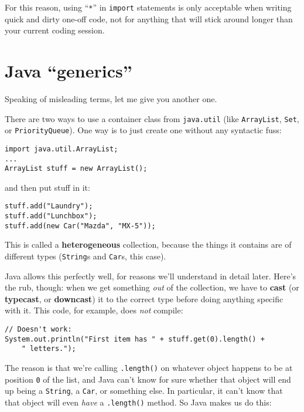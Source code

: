 For this reason, using ``\texttt{*}'' in \texttt{import} statements is only
acceptable when writing quick and dirty one-off code, not for anything that
will stick around longer than your current coding session.



\section{Java ``generics''}
\label{sec:generics}

Speaking of misleading terms, let me give you another one.

There are two ways to use a container class from \texttt{java.util} (like
\texttt{ArrayList}, \texttt{Set}, or \texttt{PriorityQueue}). One way is to
just create one without any syntactic fuss:

\begin{Verbatim}[fontsize=\small,samepage=true,frame=single]
import java.util.ArrayList;
...
ArrayList stuff = new ArrayList();
\end{Verbatim}

and then put stuff in it:

\begin{Verbatim}[fontsize=\small,samepage=true,frame=single]
stuff.add("Laundry");
stuff.add("Lunchbox");
stuff.add(new Car("Mazda", "MX-5"));
\end{Verbatim}

This is called a \textbf{heterogeneous} collection, because the things it
contains are of different types (\texttt{String}s and \texttt{Car}s, this
case).

Java allows this perfectly well, for reasons we'll understand in detail later.
Here's the rub, though: when we get something \textit{out} of the collection,
we have to \textbf{cast} (or \textbf{typecast}, or \textbf{downcast}) it to
the correct type before doing anything specific with it. This code, for
example, does \textit{not} compile:

\begin{Verbatim}[fontsize=\small,samepage=true]
// Doesn't work:
System.out.println("First item has " + stuff.get(0).length() +
    " letters.");
\end{Verbatim}

The reason is that we're calling \texttt{.length()} on whatever object happens
to be at position \texttt{0} of the list, and Java can't know for sure whether
that object will end up being a \texttt{String}, a \texttt{Car}, or something
else. In particular, it can't know that that object will even \textit{have} a
\texttt{.length()} method. So Java makes us do this:


